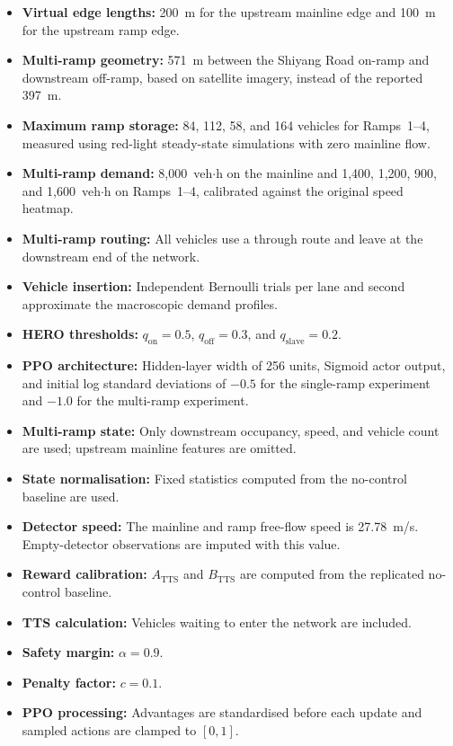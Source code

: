 \documentclass{rescience}
\begin{document}
\begin{itemize}
    \item \textbf{Virtual edge lengths:} 200~m for the upstream mainline edge and 100~m for the upstream ramp edge.
    \item \textbf{Multi-ramp geometry:} 571~m between the Shiyang Road on-ramp and downstream off-ramp, based on satellite imagery, instead of the reported 397~m.
    \item \textbf{Maximum ramp storage:} 84, 112, 58, and 164 vehicles for Ramps~1--4, measured using red-light steady-state simulations with zero mainline flow.
    \item \textbf{Multi-ramp demand:} 8{,}000~veh$\cdot$h on the mainline and 1{,}400, 1{,}200, 900, and 1{,}600~veh$\cdot$h on Ramps~1--4, calibrated against the original speed heatmap.
    \item \textbf{Multi-ramp routing:} All vehicles use a through route and leave at the downstream end of the network.
    \item \textbf{Vehicle insertion:} Independent Bernoulli trials per lane and second approximate the macroscopic demand profiles.
    \item \textbf{HERO thresholds:} $q_\mathrm{on}=0.5$, $q_\mathrm{off}=0.3$, and $q_\mathrm{slave}=0.2$.
    \item \textbf{PPO architecture:} Hidden-layer width of 256 units, Sigmoid actor output, and initial log standard deviations of $-0.5$ for the single-ramp experiment and $-1.0$ for the multi-ramp experiment.
    \item \textbf{Multi-ramp state:} Only downstream occupancy, speed, and vehicle count are used; upstream mainline features are omitted.
    \item \textbf{State normalisation:} Fixed statistics computed from the no-control baseline are used.
    \item \textbf{Detector speed:} The mainline and ramp free-flow speed is 27.78~m/s. Empty-detector observations are imputed with this value.
    \item \textbf{Reward calibration:} $A_{\mathrm{TTS}}$ and $B_{\mathrm{TTS}}$ are computed from the replicated no-control baseline.
    \item \textbf{TTS calculation:} Vehicles waiting to enter the network are included.
    \item \textbf{Safety margin:} $\alpha=0.9$.
    \item \textbf{Penalty factor:} $c=0.1$.
    \item \textbf{PPO processing:} Advantages are standardised before each update and sampled actions are clamped to $[0,1]$.

\end{itemize}
\end{document}
